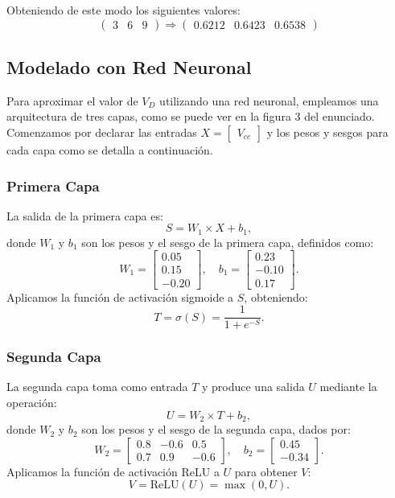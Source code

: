 \documentclass[paper=a4, fontsize=11pt]{scrartcl} %
\numberwithin{equation}{section} %
\numberwithin{figure}{section} %
\numberwithin{table}{section} %
\begin{document}
Obteniendo de este modo los siguientes valores:
\[
\begin{pmatrix} 3 & 6 & 9\end{pmatrix} \Rightarrow \begin{pmatrix} 0.6212 & 0.6423 & 0.6538 \end{pmatrix}
\]


\subsection{Modelado con Red Neuronal}

Para aproximar el valor de $V_D$ utilizando una red neuronal, empleamos una arquitectura de tres capas, como se puede ver en la figura 3 del enunciado. Comenzamos por declarar las entradas $X = \begin{bmatrix} V_{cc} \end{bmatrix}$ y los pesos y sesgos para cada capa como se detalla a continuación.

\subsubsection{Primera Capa}

La salida de la primera capa es:
\[
S = W_1 \times X + b_1,
\]
donde $W_1$ y $b_1$ son los pesos y el sesgo de la primera capa, definidos como:
\[
W_1 = \begin{bmatrix} 0.05 \\ 0.15 \\ -0.20 \end{bmatrix}, \quad b_1 = \begin{bmatrix} 0.23 \\ -0.10 \\ 0.17 \end{bmatrix}.
\]
Aplicamos la función de activación sigmoide a $S$, obteniendo:
\[
T = \sigma(S) = \frac{1}{1 + e^{-S}}.
\]

\subsubsection{Segunda Capa}

La segunda capa toma como entrada $T$ y produce una salida $U$ mediante la operación:
\[
U = W_2 \times T + b_2,
\]
donde $W_2$ y $b_2$ son los pesos y el sesgo de la segunda capa, dados por:
\[
W_2 = \begin{bmatrix} 0.8 & -0.6 & 0.5 \\ 0.7 & 0.9 & -0.6 \end{bmatrix}, \quad b_2 = \begin{bmatrix} 0.45 \\ -0.34 \end{bmatrix}.
\]
Aplicamos la función de activación ReLU a $U$ para obtener $V$:
\[
V = \text{ReLU}(U) = \max(0, U).
\]
\end{document}
